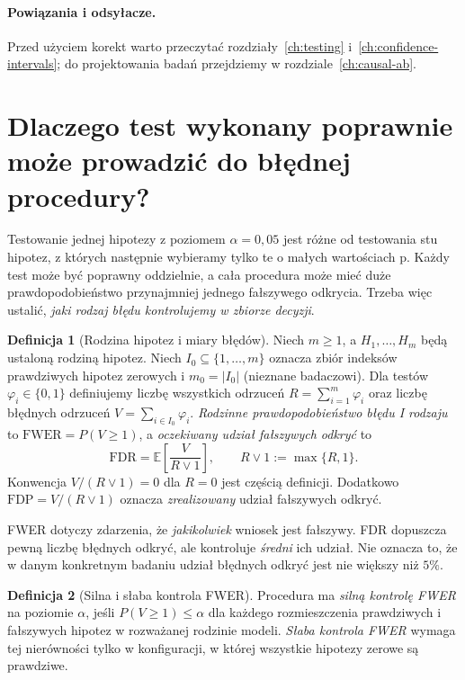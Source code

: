 \documentclass[11pt,a4paper,oneside]{report}
\numberwithin{equation}{chapter}
\theoremstyle{plain}
\theoremstyle{definition}
\newtheorem{definicja}{Definicja}[chapter]
\theoremstyle{remark}
\newcommand{\E}{\mathbb E}
\begin{document}
\paragraph{Powiązania i odsyłacze.} Przed użyciem korekt warto przeczytać rozdziały~\ref{ch:testing} i~\ref{ch:confidence-intervals}; do projektowania badań przejdziemy w rozdziale~\ref{ch:causal-ab}.


\section{Dlaczego test wykonany poprawnie może prowadzić do błędnej procedury?}
Testowanie jednej hipotezy z poziomem $\alpha=0{,}05$ jest
różne od testowania stu hipotez, z których następnie
wybieramy tylko te o małych wartościach p. Każdy test
może być poprawny oddzielnie, a cała procedura może mieć
duże prawdopodobieństwo przynajmniej jednego
fałszywego odkrycia. Trzeba więc ustalić, \emph{jaki rodzaj
błędu kontrolujemy w zbiorze decyzji}.

\begin{definicja}[Rodzina hipotez i miary błędów]\label{def:fwer-fdr}
Niech $m\ge1$, a $H_1,\ldots,H_m$ będą ustaloną rodziną
hipotez. Niech $I_0\subseteq\{1,\ldots,m\}$ oznacza
zbiór indeksów prawdziwych hipotez zerowych i
$m_0=|I_0|$ (nieznane badaczowi). Dla testów
$\varphi_i\in\{0,1\}$ definiujemy liczbę wszystkich
odrzuceń $R=\sum_{i=1}^m\varphi_i$ oraz liczbę
błędnych odrzuceń $V=\sum_{i\in I_0}\varphi_i$.
\emph{Rodzinne prawdopodobieństwo błędu I rodzaju} to
$\mathrm{FWER}=P(V\ge1)$, a \emph{oczekiwany udział
fałszywych odkryć} to
\[
 \mathrm{FDR}=\E\left[\frac{V}{R\vee1}\right],
 \qquad R\vee1:=\max\{R,1\}.
\]
Konwencja $V/(R\vee1)=0$ dla $R=0$ jest częścią definicji.
Dodatkowo $\mathrm{FDP}=V/(R\vee1)$ oznacza
\emph{zrealizowany} udział fałszywych odkryć.
\end{definicja}

FWER dotyczy zdarzenia, że \emph{jakikolwiek} wniosek
jest fałszywy. FDR dopuszcza pewną liczbę błędnych
odkryć, ale kontroluje \emph{średni} ich udział.
Nie oznacza to, że w danym konkretnym badaniu udział
błędnych odkryć jest nie większy niż $5\%$.

\begin{definicja}[Silna i słaba kontrola FWER]
Procedura ma \emph{silną kontrolę FWER} na poziomie
$\alpha$, jeśli $P(V\ge1)\le\alpha$ dla każdego
rozmieszczenia prawdziwych i fałszywych hipotez w rozważanej
rodzinie modeli. \emph{Słaba kontrola FWER} wymaga tej
nierówności tylko w konfiguracji, w której wszystkie
hipotezy zerowe są prawdziwe.
\end{definicja}
\end{document}
